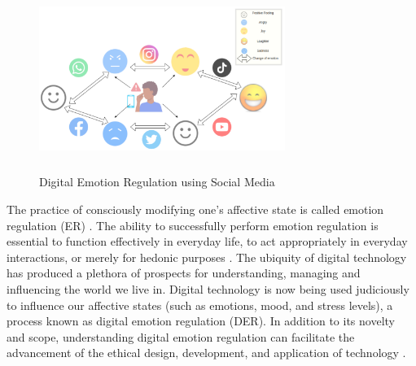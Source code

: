 \documentclass[lettersize,journal]{IEEEtran}
\begin{document}
\begin{figure}[h]
  
    \centering
    \includegraphics[width=8cm,height=6cm,keepaspectratio]{DER.pdf}
  \caption{Digital Emotion Regulation using Social Media}
  \label{fig:SMER}
  \end{figure}
The practice of consciously modifying one's affective state is called emotion regulation (ER) \cite{gross1998emerging}. The ability to successfully perform emotion regulation is essential to function effectively in everyday life, to act appropriately in everyday interactions, or merely for hedonic purposes \cite{webb2012dealing}. The ubiquity of digital technology has produced a plethora of prospects for understanding, managing and influencing the world we live in. Digital technology is now being used judiciously to influence our affective states (such as emotions, mood, and stress levels), a process known as digital emotion regulation (DER). In addition to its novelty and scope, understanding digital emotion regulation can facilitate the advancement of the ethical design, development, and application of technology \cite{wadley2020digital}.
\end{document}
